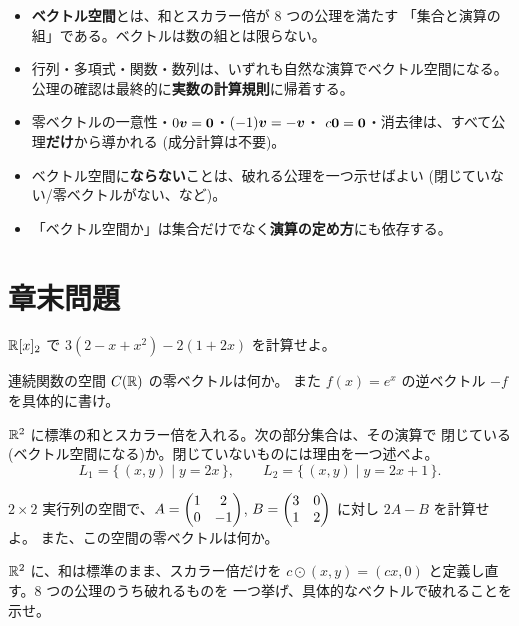 \begin{matome}
\begin{itemize}
\item \textbf{ベクトル空間}とは、和とスカラー倍が $8$ つの公理を満たす
「集合と演算の組」である。ベクトルは数の組とは限らない。
\item 行列・多項式・関数・数列は、いずれも自然な演算でベクトル空間になる。
公理の確認は最終的に\textbf{実数の計算規則}に帰着する。
\item 零ベクトルの一意性・$0\bm{v} = \bm{0}$・$(-1)\bm{v} = -\bm{v}$・
$c\bm{0} = \bm{0}$・消去律は、すべて公理\textbf{だけ}から導かれる
(成分計算は不要)。
\item ベクトル空間に\textbf{ならない}ことは、破れる公理を一つ示せばよい
(閉じていない/零ベクトルがない、など)。
\item 「ベクトル空間か」は集合だけでなく\textbf{演算の定め方}にも依存する。
\end{itemize}
\end{matome}

\section*{章末問題}

\begin{mondai}[基本]\label{q:vs-ex1}
$\mathbb{R}[x]_2$ で $3(2 - x + x^2) - 2(1 + 2x)$ を計算せよ。
\end{mondai}

\begin{mondai}[基本]\label{q:vs-ex2}
連続関数の空間 $C(\mathbb{R})$ の零ベクトルは何か。
また $f(x) = e^x$ の逆ベクトル $-f$ を具体的に書け。
\end{mondai}

\begin{mondai}[基本]\label{q:vs-ex3}
$\mathbb{R}^2$ に標準の和とスカラー倍を入れる。次の部分集合は、その演算で
閉じている(ベクトル空間になる)か。閉じていないものには理由を一つ述べよ。
\[
L_1 = \{\,(x, y) \mid y = 2x \,\}, \qquad
L_2 = \{\,(x, y) \mid y = 2x + 1 \,\}.
\]
\end{mondai}

\begin{mondai}[基本]\label{q:vs-ex4}
$2 \times 2$ 実行列の空間で、$A = \begin{pmatrix}1 & 2 \\ 0 & -1\end{pmatrix}$,
$B = \begin{pmatrix}3 & 0 \\ 1 & 2\end{pmatrix}$ に対し $2A - B$ を計算せよ。
また、この空間の零ベクトルは何か。
\end{mondai}

\begin{mondai}[標準]\label{q:vs-ex5}
$\mathbb{R}^2$ に、和は標準のまま、スカラー倍だけを
$c \odot (x, y) = (cx, 0)$ と定義し直す。$8$ つの公理のうち破れるものを
一つ挙げ、具体的なベクトルで破れることを示せ。
\end{mondai}

